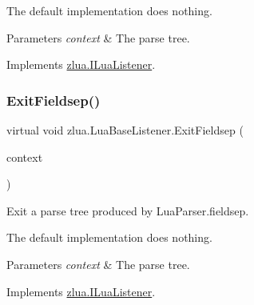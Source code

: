 The default implementation does nothing.


\begin{DoxyParams}{Parameters}
{\em context} & The parse tree.\\
\hline
\end{DoxyParams}


Implements \mbox{\hyperlink{interfacezlua_1_1_i_lua_listener_a8fbc0020ba9e41655757791877b61985}{zlua.\+I\+Lua\+Listener}}.

\mbox{\label{classzlua_1_1_lua_base_listener_aa7266127d89148ed4d6a559e5b59525e}} 
\subsubsection{\texorpdfstring{Exit\+Fieldsep()}{ExitFieldsep()}}
{\footnotesize\ttfamily virtual void zlua.\+Lua\+Base\+Listener.\+Exit\+Fieldsep (\begin{DoxyParamCaption}\item[{\mbox{[}\+Not\+Null\mbox{]} \mbox{\hyperlink{classzlua_1_1_lua_parser_1_1_fieldsep_context}{Lua\+Parser.\+Fieldsep\+Context}}}]{context }\end{DoxyParamCaption})\hspace{0.3cm}{\ttfamily [virtual]}}



Exit a parse tree produced by Lua\+Parser.\+fieldsep. 

The default implementation does nothing.


\begin{DoxyParams}{Parameters}
{\em context} & The parse tree.\\
\hline
\end{DoxyParams}


Implements \mbox{\hyperlink{interfacezlua_1_1_i_lua_listener_a3b2a4e6980def8cb07c26f52be3c22de}{zlua.\+I\+Lua\+Listener}}.

\mbox{\label{classzlua_1_1_lua_base_listener_a89ec0f76f1e78b15a72de26783bc6694}} 

